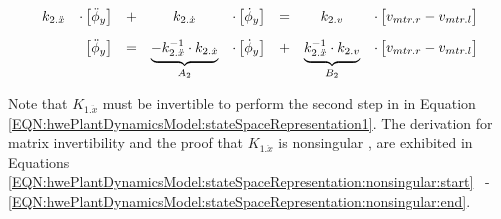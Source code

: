 \documentclass[crop=false,float=true,class=scrreprt]{standalone}
\begin{document}
\begin{equation}
\label{EQN:hwePlantDynamicsModel:stateSpaceRepresentation2}
\begin{array}{ccccccccccc}
k_{2.\ddot{x}}
& \cdot 
\begin{bmatrix}
\ddot{\phi}_{y}\\
\end{bmatrix}
& + &
k_{2.\dot{x}} 
& \cdot 
\begin{bmatrix}
\dot{\phi}_{y}\\
\end{bmatrix}
& = &
k_{2.v}
& \cdot
\begin{bmatrix}
v_{mtr.r} - v_{mtr.l}\\
\end{bmatrix}
\\[+1em]

& \hphantom{\cdot}
\begin{bmatrix}
\ddot{\phi}_{y}\\
\end{bmatrix}
& = &
\underbrace{
\vphantom{\begin{bmatrix} a \\ \end{bmatrix}}
\begin{matrix}
-k_{2.\ddot{x}}^{-1}
\cdot 
k_{2.\dot{x}} 
\end{matrix}
}_{A_{2}}
& \cdot 
\begin{bmatrix}
\dot{\phi}_{y}\\
\end{bmatrix}
& + &
\underbrace{
\vphantom{\begin{bmatrix} a \\ \end{bmatrix}}
\begin{matrix}
k_{2.\ddot{x}}^{-1}
\cdot 
k_{2.v}
\end{matrix}
}_{B_{2}}
& \cdot
\begin{bmatrix}
v_{mtr.r} - v_{mtr.l}\\
\end{bmatrix}
\end{array}
\end{equation}




\vspace*{\fill}



Note that $K_{1.\ddot{x}}$ 
must be invertible
to perform the second step in
in Equation~%
\eqref{EQN:hwePlantDynamicsModel:stateSpaceRepresentation1}.
The derivation for matrix invertibility
and the proof that $K_{1.\ddot{x}}$ is nonsingular {},
are exhibited in Equations
\eqref{EQN:hwePlantDynamicsModel:stateSpaceRepresentation:nonsingular:start}~%
-~%
\eqref{EQN:hwePlantDynamicsModel:stateSpaceRepresentation:nonsingular:end}.
\end{document}
